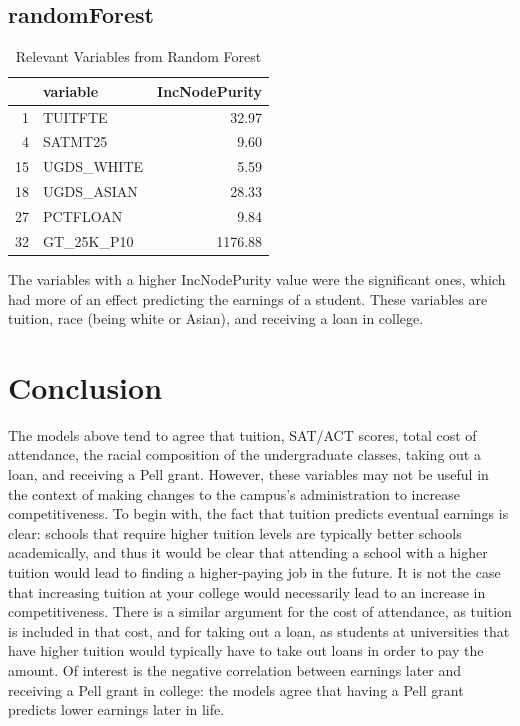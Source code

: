 \documentclass{article}
\begin{document}
\subsection{randomForest}

\begin{table}[ht]
\centering
\begin{tabular}{rlr}
  \hline
 & variable & IncNodePurity \\ 
  \hline
1 & TUITFTE & 32.97 \\ 
  4 & SATMT25 & 9.60 \\ 
  15 & UGDS\_WHITE & 5.59 \\ 
  18 & UGDS\_ASIAN & 28.33 \\ 
  27 & PCTFLOAN & 9.84 \\ 
  32 & GT\_25K\_P10 & 1176.88 \\ 
   \hline
\end{tabular}
\caption{Relevant Variables from Random Forest} 
\end{table}
The variables with a higher IncNodePurity value were the significant ones, which had more of an effect predicting the earnings of a student. These variables are tuition, race (being white or Asian), and receiving a loan in college.

\section{Conclusion}

The models above tend to agree that tuition, SAT/ACT scores, total cost of attendance, the racial composition of the undergraduate classes, taking out a loan, and receiving a Pell grant. However, these variables may not be useful in the context of making changes to the campus's administration to increase competitiveness. To begin with, the fact that tuition predicts eventual earnings is clear: schools that require higher tuition levels are typically better schools academically, and thus it would be clear that attending a school with a higher tuition would lead to finding a higher-paying job in the future. It is not the case that increasing tuition at your college would necessarily lead to an increase in competitiveness. There is a similar argument for the cost of attendance, as tuition is included in that cost, and for taking out a loan, as students at universities that have higher tuition would typically have to take out loans in order to pay the amount. Of interest is the negative correlation between earnings later and receiving a Pell grant in college: the models agree that having a Pell grant predicts lower earnings later in life. 
\end{document}
